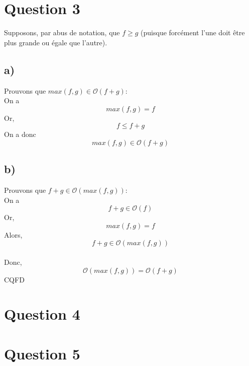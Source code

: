 \documentclass[12pt]{article}
\begin{document}
  \newpage

  \section*{Question 3}
  Supposons, par abus de notation, que $f \geq g$ (puisque forcément l'une doit
  être plus grande ou égale que l'autre).

  \subsection*{a)}
  Prouvons que $max(f, g) \in  \mathcal{O}(f + g)$:\\
  On a
  \[max(f,g) = f\]
  Or, \[f \leq f + g\]
  On a donc
  \[max(f,g) \in \mathcal{O}(f + g)\]

  \subsection*{b)}
  Prouvons que $f + g \in \mathcal{O}(max(f, g))$:\\
  On a
  \[f + g \in \mathcal{O}(f)\]
  Or,
  \[max(f, g) = f\]
  Alors,
  \[f + g \in \mathcal{O}(max(f, g))\]\\
  Donc, \[\mathcal{O}(max(f, g)) = \mathcal{O}(f + g)\]
  \hspace*{0pt}\hfill CQFD
  \newpage

  \section*{Question 4}

  \newpage

  \section*{Question 5}

  \newpage
\end{document}
